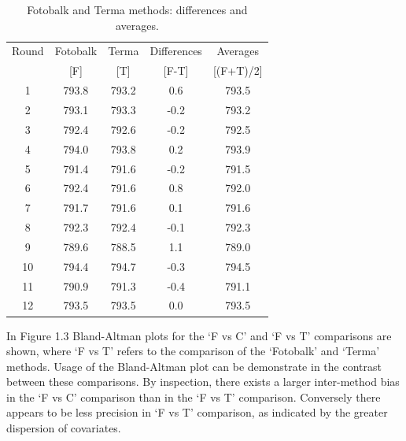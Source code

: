 \documentclass[12pt, a4paper]{report}
\theoremstyle{plain}
\theoremstyle{definition}
\theoremstyle{remark}
\begin{document}
	\begin{table}[h!]
		\renewcommand\arraystretch{0.7}%
		\begin{center}
			\begin{tabular}{|c||c|c||c|c|}
				\hline
				Round & Fotobalk  & Terma  & Differences  & Averages  \\
				&  [F] & [T] & [F-T] &  [(F+T)/2] \\
				\hline
				1 & 793.8 & 793.2 & 0.6 & 793.5 \\
				2 & 793.1 & 793.3 & -0.2 & 793.2 \\
				3 & 792.4 & 792.6 & -0.2 & 792.5 \\
				4 & 794.0 & 793.8 & 0.2 & 793.9 \\
				5 & 791.4 & 791.6 & -0.2 & 791.5 \\
				6 & 792.4& 791.6 & 0.8 & 792.0 \\
				7 & 791.7 & 791.6 & 0.1 & 791.6 \\
				8 & 792.3 & 792.4 & -0.1 & 792.3 \\
				9 & 789.6 & 788.5 & 1.1 & 789.0 \\
				10 & 794.4 & 794.7 & -0.3 & 794.5 \\
				11 & 790.9 & 791.3 & -0.4 & 791.1 \\
				12 & 793.5 & 793.5 & 0.0 & 793.5 \\
				
				\hline
			\end{tabular}
			\caption{Fotobalk and Terma methods: differences and averages.}
		\end{center}
	\end{table}
	
	\newpage
	
	
	
	
	In Figure 1.3 Bland-Altman plots for the `F vs C' and `F vs T'
	comparisons are shown, where `F vs T' refers to the comparison of
	the `Fotobalk' and `Terma' methods. Usage of the Bland-Altman plot
	can be demonstrate in the contrast between these comparisons. By inspection, there exists a larger inter-method bias in the `F vs C' comparison than in the `F vs T' comparison. Conversely there
	appears to be less precision in `F vs T' comparison, as indicated
	by the greater dispersion of covariates.
	
\end{document}
